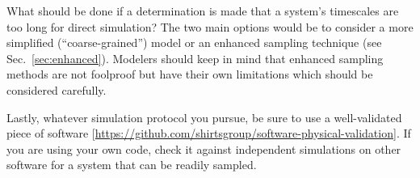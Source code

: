 What should be done if a determination is made that a system's timescales are too long for direct simulation?
The two main options would be to consider a more simplified (``coarse-grained'') model \cite{Merchant2011,Kmiecik2016} or an enhanced sampling technique (see Sec.~\ref{sec:enhanced}).
Modelers should keep in mind that enhanced sampling methods are not foolproof but have their own limitations which should be considered carefully.

Lastly, whatever simulation protocol you pursue, be sure to use a well-validated piece of software [\url{https://github.com/shirtsgroup/software-physical-validation}].
If you are using your own code, check it against independent simulations on other software for a system that can be readily sampled.

